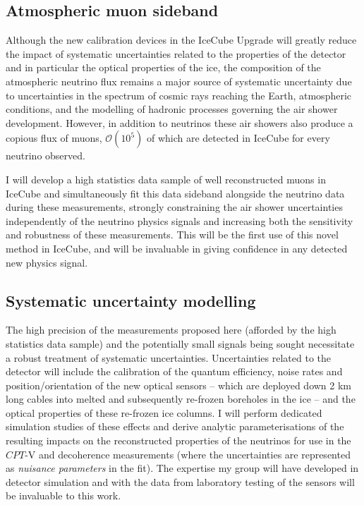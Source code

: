 \documentclass[a4paper,11pt]{article}
\begin{document}
\subsection{Atmospheric muon sideband}

Although the new calibration devices in the IceCube Upgrade will greatly reduce the impact of systematic uncertainties related to the properties of the detector and in particular the optical properties of the ice, the composition of the atmospheric neutrino flux remains a major source of systematic uncertainty due to uncertainties in the spectrum of cosmic rays reaching the Earth, atmospheric conditions, and the modelling of hadronic processes governing the air shower development. However, in addition to neutrinos these air showers also produce a copious flux of muons, $\mathcal{O}(10^5)$ of which are detected in IceCube for every neutrino observed. 

I will develop a high statistics data sample of well reconstructed muons in IceCube and simultaneously fit this data sideband alongside the neutrino data during these measurements, strongly constraining the air shower uncertainties independently of the neutrino physics signals and increasing both the sensitivity and robustness of these measurements. This will be the first use of this novel method in IceCube, and will be invaluable in giving confidence in any detected new physics signal. \\




\subsection{Systematic uncertainty modelling}


The high precision of the measurements proposed here (afforded by the high statistics data sample) and the potentially small signals being sought necessitate a robust treatment of systematic uncertainties. Uncertainties related to the detector will include the calibration of the quantum efficiency, noise rates and position/orientation of the new optical sensors -- which are deployed down 2 km long cables into melted and subsequently re-frozen boreholes in the ice -- and the optical properties of these re-frozen ice columns. I will perform dedicated simulation studies of these effects and derive analytic parameterisations of the resulting impacts on the reconstructed properties of the neutrinos for use in the $CPT$-V and decoherence measurements (where the uncertainties are represented as \textit{nuisance parameters} in the fit). The expertise my group will have developed in detector simulation and with the data from laboratory testing of the sensors will be invaluable to this work.
\end{document}
